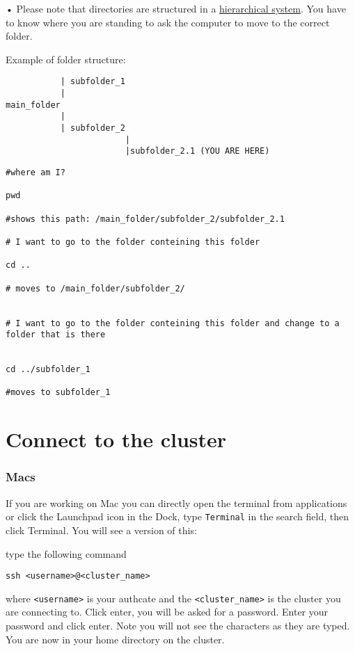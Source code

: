 \documentclass[
]{book}
\begin{document}
• Please note that directories are structured in a \href{https://www.geeksforgeeks.org/structures-of-directory-in-operating-system/}{hierarchical system}. You have to know where you are standing to ask the computer to move to the correct folder.

Example of folder structure:

\begin{verbatim}
           | subfolder_1 
           | 
main_folder
           |
           | subfolder_2
                        |
                        |subfolder_2.1 (YOU ARE HERE)
\end{verbatim}

\begin{verbatim}
#where am I?

pwd

#shows this path: /main_folder/subfolder_2/subfolder_2.1

# I want to go to the folder conteining this folder

cd ..

# moves to /main_folder/subfolder_2/


# I want to go to the folder conteining this folder and change to a folder that is there


cd ../subfolder_1

#moves to subfolder_1
\end{verbatim}

\hypertarget{connect-to-the-cluster}{%
\chapter{Connect to the cluster}\label{connect-to-the-cluster}}

\hypertarget{macs}{%
\subsection{Macs}\label{macs}}

If you are working on Mac you can directly open the terminal from applications or click the Launchpad icon in the Dock, type \texttt{Terminal} in the search field, then click Terminal. You will see a version of this:

type the following command

\begin{verbatim}
ssh <username>@<cluster_name>
\end{verbatim}

where \texttt{\textless{}username\textgreater{}} is your authcate and the \texttt{\textless{}cluster\_name\textgreater{}} is the cluster you are connecting to. Click enter, you will be asked for a password. Enter your password and click enter. Note you will not see the characters as they are typed. You are now in your home directory on the cluster.
\end{document}
